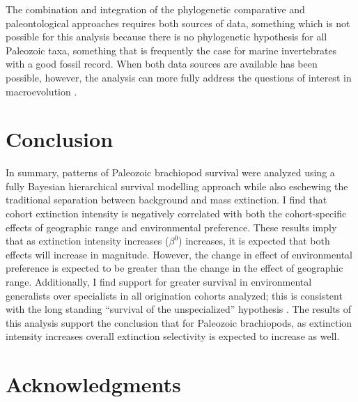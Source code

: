 \documentclass[11pt]{article}
\begin{document}
The combination and integration of the phylogenetic comparative and paleontological approaches requires both sources of data, something which is not possible for this analysis because there is no phylogenetic hypothesis for all Paleozoic taxa, something that is frequently the case for marine invertebrates with a good fossil record. When both data sources are available has been possible, however, the analysis can more fully address the questions of interest in macroevolution \citep{Smits2015,Slater2013a,Slater2015b,Simpson2011,Tomiya2013,Slater2012,Raia2013c,Raia2012f,Harnik2014,Fritz2013a}.

\section*{Conclusion}
In summary, patterns of Paleozoic brachiopod survival were analyzed using a fully Bayesian hierarchical survival modelling approach while also eschewing the traditional separation between background and mass extinction. I find that cohort extinction intensity is negatively correlated with both the cohort-specific effects of geographic range and environmental preference. These results imply that as extinction intensity increases (\(\beta^{0}\)) increases, it is expected that both effects will increase in magnitude. However, the change in effect of environmental preference is expected to be greater than the change in the effect of geographic range. Additionally, I find support for greater survival in environmental generalists over specialists in all origination cohorts analyzed; this is consistent with the long standing ``survival of the unspecialized'' hypothesis \citep{Liow2004a,Liow2007b,Simpson1944,Simpson1953,Smits2015,Nurnberg2015,Nurnberg2013a, Baumiller1993}. The results of this analysis support the conclusion that for Paleozoic brachiopods, as extinction intensity increases overall extinction selectivity is expected to increase as well.







\section*{Acknowledgments}
\end{document}
